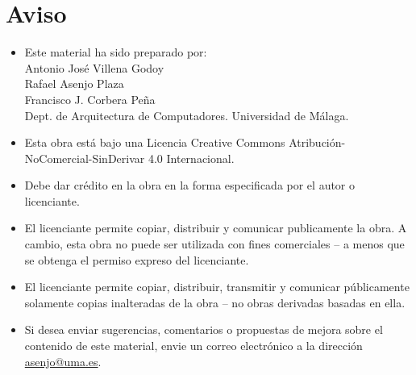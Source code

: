 \renewcommand{\footrulewidth}{0pt}
\renewcommand{\headrulewidth}{0pt}

\chapter*{Aviso}
\thispagestyle{empty}
\fancyhead{} 
\fancyfoot{}

\begin{itemize}

\item Este material ha sido preparado por:\\[0.1cm]
\hspace*{2cm}Antonio José Villena Godoy\\[0.1cm]
\hspace*{2cm}Rafael Asenjo Plaza\\[0.1cm]
\hspace*{2cm}Francisco J. Corbera Peña\\[0.1cm]
\hspace*{2cm}Dept. de Arquitectura de Computadores.
Universidad de Málaga.

\item \ccLogo\hspace{1em} Esta obra está bajo una Licencia Creative Commons 
Atribución-NoComercial-SinDerivar 4.0 Internacional.

\item \ccAttribution\hspace{1em} Debe dar crédito en la obra en la forma especificada por el
autor o licenciante.

\item \ccNonCommercialEU\hspace{1em} El licenciante permite copiar, distribuir y comunicar publicamente
la obra. A cambio, esta obra no puede ser utilizada con fines comerciales
-- a menos que se obtenga el permiso expreso del licenciante.

\item \ccNoDerivatives\hspace{1em} El licenciante permite copiar, distribuir, transmitir y comunicar
públicamente solamente copias inalteradas de la obra -- no obras derivadas
basadas en ella.

\item Si desea enviar sugerencias, comentarios o propuestas de mejora sobre el
contenido de este material, envie un correo electrónico a la dirección
\url{asenjo@uma.es}.

\end{itemize}
